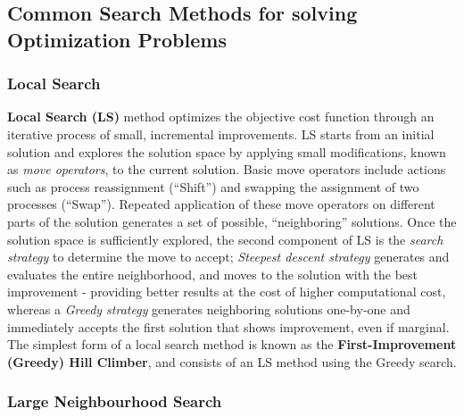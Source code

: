 \documentclass[a4paper,12pt]{Classes/RoboticsLaTeX}
\begin{document}
\subsection{Common Search Methods for solving Optimization Problems}


\subsubsection{Local Search}

\textbf{Local Search (LS)} method optimizes the objective cost function
through an iterative process of small, incremental improvements. LS
starts from an initial solution and explores the solution space by
applying small modifications, known as \emph{move operators}, to the
current solution. Basic move operators include actions such as process
reassignment (``Shift'') and swapping the assignment of two processes
(``Swap''). Repeated application of these move operators on different
parts of the solution generates a set of possible, ``neighboring''
solutions. Once the solution space is sufficiently explored, the second
component of LS is the \emph{search strategy} to determine the move to
accept; \emph{Steepest descent strategy} generates and evaluates the
entire neighborhood, and moves to the solution with the best improvement
- providing better results at the cost of higher computational cost,
whereas a \emph{Greedy strategy} generates neighboring solutions
one-by-one and immediately accepts the first solution that shows
improvement, even if marginal. The simplest form of a local search
method is known as the \textbf{First-Improvement (Greedy) Hill Climber},
and consists of an LS method using the Greedy search. \cite{voudourisGuidedLocalSearch2010}

\subsubsection{Large Neighbourhood Search}
\end{document}

